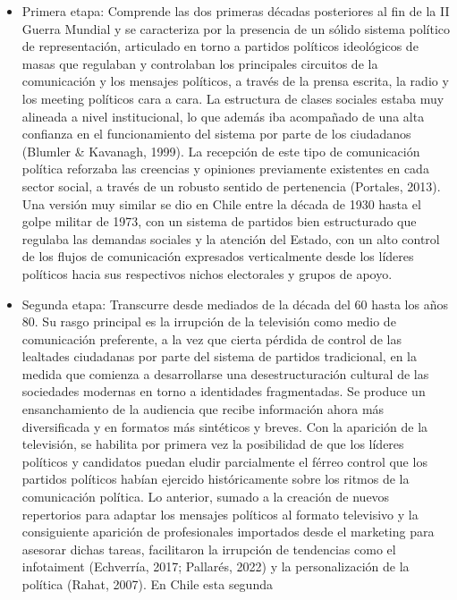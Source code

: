 \documentclass[
  10pt,
  letterpaper,
]{report}
\begin{document}
\begin{itemize}
\item
  Primera etapa: Comprende las dos primeras décadas posteriores al fin
  de la II Guerra Mundial y se caracteriza por la presencia de un sólido
  sistema político de representación, articulado en torno a partidos
  políticos ideológicos de masas que regulaban y controlaban los
  principales circuitos de la comunicación y los mensajes políticos, a
  través de la prensa escrita, la radio y los meeting políticos cara a
  cara. La estructura de clases sociales estaba muy alineada a nivel
  institucional, lo que además iba acompañado de una alta confianza en
  el funcionamiento del sistema por parte de los ciudadanos (Blumler \&
  Kavanagh, 1999). La recepción de este tipo de comunicación política
  reforzaba las creencias y opiniones previamente existentes en cada
  sector social, a través de un robusto sentido de pertenencia
  (Portales, 2013). Una versión muy similar se dio en Chile entre la
  década de 1930 hasta el golpe militar de 1973, con un sistema de
  partidos bien estructurado que regulaba las demandas sociales y la
  atención del Estado, con un alto control de los flujos de comunicación
  expresados verticalmente desde los líderes políticos hacia sus
  respectivos nichos electorales y grupos de apoyo.
\item
  Segunda etapa: Transcurre desde mediados de la década del 60 hasta los
  años 80. Su rasgo principal es la irrupción de la televisión como
  medio de comunicación preferente, a la vez que cierta pérdida de
  control de las lealtades ciudadanas por parte del sistema de partidos
  tradicional, en la medida que comienza a desarrollarse una
  desestructuración cultural de las sociedades modernas en torno a
  identidades fragmentadas. Se produce un ensanchamiento de la audiencia
  que recibe información ahora más diversificada y en formatos más
  sintéticos y breves. Con la aparición de la televisión, se habilita
  por primera vez la posibilidad de que los líderes políticos y
  candidatos puedan eludir parcialmente el férreo control que los
  partidos políticos habían ejercido históricamente sobre los ritmos de
  la comunicación política. Lo anterior, sumado a la creación de nuevos
  repertorios para adaptar los mensajes políticos al formato televisivo
  y la consiguiente aparición de profesionales importados desde el
  marketing para asesorar dichas tareas, facilitaron la irrupción de
  tendencias como el infotaiment (Echverría, 2017; Pallarés, 2022) y la
  personalización de la política (Rahat, 2007). En Chile esta segunda

\end{itemize}
\end{document}
